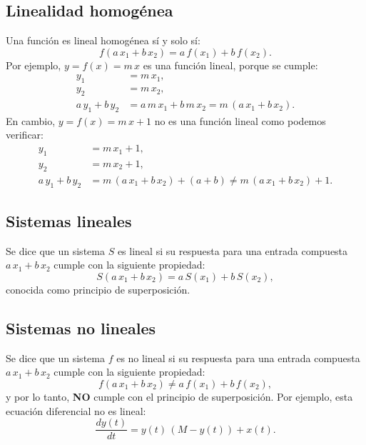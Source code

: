 \subsection{Linealidad homogénea}
Una función es lineal homogénea sí y solo sí:
\begin{equation}
	f(a \, x_{1} + b \, x_{2}) = a \, f(x_{1}) + b \, f(x_{2}).
\end{equation}
Por ejemplo, $y = f(x) = m \, x$ es una función lineal, porque se cumple:
\begin{equation}
	\begin{array}{ll}
		y_{1} & = m \, x_{1}, \\ 
		y_{2} & = m \, x_{2}, \\ 
		a \, y_{1}+ b \, y_{2} & = a \, m \, x_{1} + b \, m \, x_{2} = m \, (a \, x_{1}+ b \, x_{2}).
	\end{array}
\end{equation}
En cambio, $y = f(x) = m \, x + 1$ no es una función lineal como podemos verificar:
\begin{equation}
	\begin{array}{ll}
		y_{1} & = m \, x_{1}+1, \\ 
		y_{2} & = m \, x_{2}+1, \\ 
		a \, y_{1}+ b \, y_{2} & = m \, (a\, x_{1}+ b \, x_{2}) + (a+b) \neq m \, (a \, x_{1}+b \, x_{2}) + 1.
	\end{array}
\end{equation}

\subsection{Sistemas lineales}
Se dice que un sistema $S$ es lineal si su respuesta para una entrada compuesta $a \, x_{1}+b \, x_{2}$ cumple con la siguiente propiedad:
\begin{equation}
	S(a \, x_{1}+ b\, x_{2}) = a \, S(x_{1}) + b \, S(x_{2}),
\end{equation}
conocida como principio de superposición.

\subsection{Sistemas no lineales}
Se dice que un sistema $f$ es no lineal si su respuesta para una entrada compuesta $a \, x_{1}+b \, x_{2}$ cumple con la siguiente propiedad:
\begin{equation}
	f(a \, x_{1}+b \, x_{2}) \neq a \, f(x_{1}) + b \, f(x_{2}),
\end{equation}
y por lo tanto, \textbf{NO} cumple con el principio de superposición. Por ejemplo, esta ecuación diferencial no es lineal:
\begin{equation}
	\frac{dy(t)}{dt} = y(t) \, (M - y(t)) + x(t).
\end{equation}

